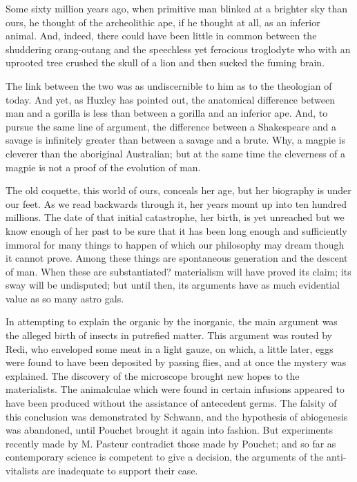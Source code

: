\documentclass[]{book}
\begin{document}
Some sixty million years ago, when primitive man blinked at a brighter
sky than ours, he thought of the archeolithic ape, if he thought at all,
as an inferior animal. And, indeed, there could have been little in
common between the shuddering orang-outang and the speechless yet
ferocious troglodyte who with an uprooted tree crushed the skull of a
lion and then sucked the fuming brain.

The link between the two was as undiscernible to him as to the
theologian of today. And yet, as Huxley has pointed out, the anatomical
difference between man and a gorilla is less than between a gorilla and
an inferior ape. And, to pursue the same line of argument, the
difference between a Shakespeare and a savage is infinitely greater than
between a savage and a brute. Why, a magpie is cleverer than the
aboriginal Australian; but at the same time the cleverness of a magpie
is not a proof of the evolution of man.

The old coquette, this world of ours, conceals her age, but her
biography is under our feet. As we read backwards through it, her years
mount up into ten hundred millions. The date of that initial
catastrophe, her birth, is yet unreached but we know enough of her past
to be sure that it has been long enough and sufficiently immoral for
many things to happen of which our philosophy may dream though it cannot
prove. Among these things are spontaneous generation and the descent of
man. When these are substantiated? materialism will have proved its
claim; its sway will be undisputed; but until then, its arguments have
as much evidential value as so many astro gals.

In attempting to explain the organic by the inorganic, the main argument
was the alleged birth of insects in putrefied matter. This argument was
routed by Redi, who enveloped some meat in a light gauze, on which, a
little later, eggs were found to have been deposited by passing flies,
and at once the mystery was explained. The discovery of the microscope
brought new hopes to the materialists. The animalculae which were found
in certain infusions appeared to have been produced without the
assistance of antecedent germs. The falsity of this conclusion was
demonstrated by Schwann, and the hypothesis of abiogenesis was
abandoned, until Pouchet brought it again into fashion. But experiments
recently made by M. Pasteur contradict those made by Pouchet; and so far
as contemporary science is competent to give a decision, the arguments
of the anti-vitalists are inadequate to support their case.
\end{document}
